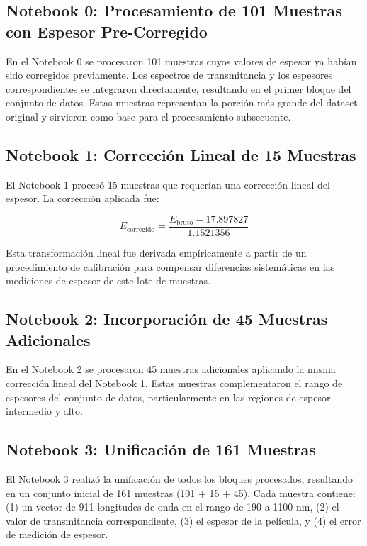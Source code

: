\documentclass{article}
\begin{document}
\subsection{Notebook 0: Procesamiento de 101 Muestras con Espesor Pre-Corregido}

En el Notebook 0 se procesaron 101 muestras cuyos valores de espesor ya hab\'ian sido corregidos previamente. Los espectros de transmitancia y los espesores correspondientes se integraron directamente, resultando en el primer bloque del conjunto de datos. Estas muestras representan la porci\'on m\'as grande del dataset original y sirvieron como base para el procesamiento subsecuente.

\subsection{Notebook 1: Correcci\'on Lineal de 15 Muestras}

El Notebook 1 proces\'o 15 muestras que requer\'ian una correcci\'on lineal del espesor. La correcci\'on aplicada fue:

\begin{equation}
E_{\text{corregido}} = \frac{E_{\text{bruto}} - 17.897827}{1.1521356}
\end{equation}

Esta transformaci\'on lineal fue derivada emp\'iricamente a partir de un procedimiento de calibraci\'on para compensar diferencias sistem\'aticas en las mediciones de espesor de este lote de muestras.

\subsection{Notebook 2: Incorporaci\'on de 45 Muestras Adicionales}

En el Notebook 2 se procesaron 45 muestras adicionales aplicando la misma correcci\'on lineal del Notebook 1. Estas muestras complementaron el rango de espesores del conjunto de datos, particularmente en las regiones de espesor intermedio y alto.

\subsection{Notebook 3: Unificaci\'on de 161 Muestras}

El Notebook 3 realiz\'o la unificaci\'on de todos los bloques procesados, resultando en un conjunto inicial de 161 muestras (101 + 15 + 45). Cada muestra contiene: (1) un vector de 911 longitudes de onda en el rango de 190 a 1100 nm, (2) el valor de transmitancia correspondiente, (3) el espesor de la pel\'icula, y (4) el error de medici\'on de espesor.
\end{document}
